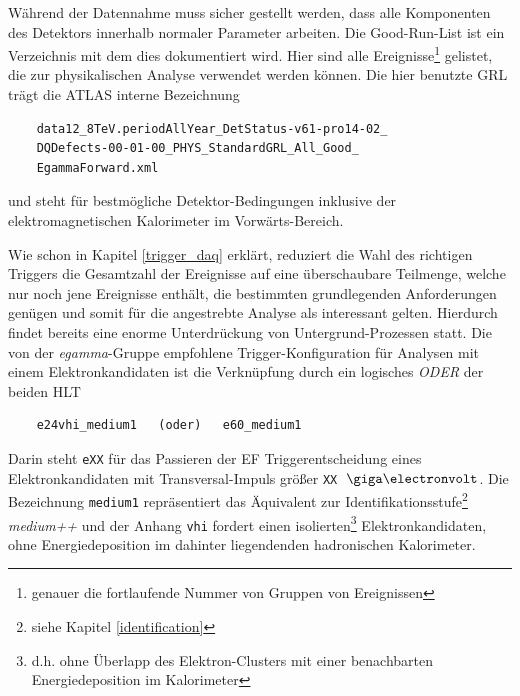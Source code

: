 \begin{description}
        Während der Datennahme muss sicher gestellt werden, dass alle
        Komponenten des Detektors innerhalb normaler Parameter arbeiten. Die
        Good-Run-List ist ein Verzeichnis mit dem dies dokumentiert wird. Hier
        sind alle Ereignisse\footnote{genauer die fortlaufende Nummer von
        Gruppen von Ereignissen} gelistet, die zur physikalischen Analyse
        verwendet werden können. Die hier benutzte \ac{GRL} trägt die ATLAS
        interne Bezeichnung
        \begin{verbatim}
    data12_8TeV.periodAllYear_DetStatus-v61-pro14-02_
    DQDefects-00-01-00_PHYS_StandardGRL_All_Good_
    EgammaForward.xml \end{verbatim}
        und steht für bestmögliche Detektor-Bedingungen inklusive der
        elektromagnetischen Kalorimeter im Vorwärts-Bereich.

        Wie schon in Kapitel \ref{trigger_daq} erklärt, reduziert die Wahl des
        richtigen Triggers die Gesamtzahl der Ereignisse auf eine überschaubare
        Teilmenge, welche nur noch jene Ereignisse enthält, die bestimmten
        grundlegenden Anforderungen genügen und somit für die angestrebte
        Analyse als interessant gelten. Hierdurch findet bereits eine enorme
        Unterdrückung von Untergrund-Prozessen statt. Die von der
        \textit{egamma}-Gruppe empfohlene Trigger-Konfiguration für Analysen
        mit einem Elektronkandidaten ist die Verknüpfung durch ein logisches
        \emph{ODER} der beiden \acl{HLT}
        \begin{verbatim}
    e24vhi_medium1   (oder)   e60_medium1 \end{verbatim}
        Darin steht \texttt{eXX} für das Passieren der \acf{EF}
        Triggerentscheidung eines Elektronkandidaten mit Transversal-Impuls
        größer \texttt{XX} $\GeV$. Die Bezeichnung \texttt{medium1}
        repräsentiert das Äquivalent zur Identifikationsstufe\footnote{siehe
        Kapitel \ref{identification}} \textit{medium++} und der Anhang
        \texttt{vhi} fordert einen isolierten\footnote{d.h. ohne Überlapp des
        Elektron-Clusters mit einer benachbarten Energiedeposition im
        Kalorimeter} Elektronkandidaten, ohne Energiedeposition im dahinter
        liegendenden hadronischen Kalorimeter.

\pagebreak


\end{description}
